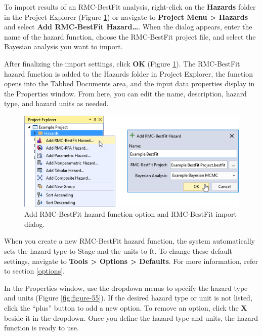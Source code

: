 \documentclass[
]{book}
\begin{document}
To import results of an RMC-BestFit analysis, right-click on the \textbf{Hazards} folder in the Project Explorer (Figure \ref{fig:figure-54}) or navigate to \textbf{Project Menu \textgreater{} Hazards} and select \textbf{Add RMC-BestFit Hazard\ldots{}}. When the dialog appears, enter the name of the hazard function, choose the RMC-BestFit project file, and select the Bayesian analysis you want to import.

After finalizing the import settings, click \textbf{OK} (Figure \ref{fig:figure-54}). The RMC-BestFit hazard function is added to the Hazards folder in Project Explorer, the function opens into the Tabbed Documents area, and the input data properties display in the Properties window. From here, you can edit the name, description, hazard type, and hazard units as needed.

\begin{figure}

{\centering \includegraphics{images/figure54} 

}

\caption{Add RMC-BestFit hazard function option and RMC-BestFit import dialog.}\label{fig:figure-54}
\end{figure}

When you create a new RMC-BestFit hazard function, the system automatically sets the hazard type to Stage and the units to ft. To change these default settings, navigate to \textbf{Tools \textgreater{} Options \textgreater{} Defaults}. For more information, refer to section \ref{options}.

In the Properties window, use the dropdown menus to specify the hazard type and units (Figure \ref{fig:figure-55}). If the desired hazard type or unit is not listed, click the ``plus'' button to add a new option. To remove an option, click the \textbf{X} beside it in the dropdown. Once you define the hazard type and units, the hazard function is ready to use.
\end{document}
